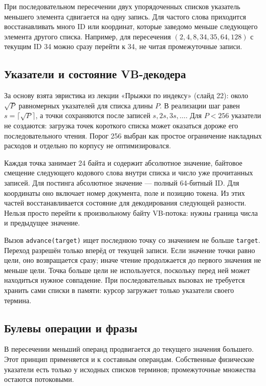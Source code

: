 \documentclass[12pt,a4paper]{article}
\begin{document}
При последовательном пересечении двух упорядоченных списков указатель
меньшего элемента сдвигается на одну запись. Для частого слова приходится
восстанавливать много ID или координат, которые заведомо меньше следующего
элемента другого списка. Например, для пересечения $(2,4,8,34,35,64,128)$
с текущим ID 34 можно сразу перейти к 34, не читая промежуточные записи.

\subsection{Указатели и состояние VB-декодера}
За основу взята эвристика из лекции «Прыжки по индексу» (слайд 22):
около $\sqrt{P}$ равномерных указателей
для списка длины $P$. В реализации шаг равен $s=\lceil\sqrt{P}\rceil$,
а точки сохраняются после записей $s,2s,3s,\ldots$.
Для $P<256$ указатели не создаются: загрузка точек короткого списка
может оказаться дороже его последовательного чтения.
Порог 256 выбран как простое ограничение накладных расходов и отдельно
по корпусу не оптимизировался.

Каждая точка занимает 24 байта и содержит абсолютное значение,
байтовое смещение следующего кодового слова внутри списка и число уже
прочитанных записей. Для постинга абсолютное значение --- полный 64-битный ID.
Для координаты оно включает номер документа, поле и позицию токена.
Из этих частей восстанавливается состояние для декодирования следующей
разности. Нельзя просто перейти к произвольному байту VB-потока:
нужны граница числа и предыдущее значение.

Вызов \texttt{advance(target)} ищет последнюю точку со значением
не больше \texttt{target}. Переход разрешён только вперёд от текущей записи.
Если значение точки равно цели, оно возвращается сразу; иначе чтение
продолжается до первого значения не меньше цели. Точка больше цели
не используется, поскольку перед ней может находиться нужное совпадение.
При последовательных вызовах не требуется хранить сами списки в памяти:
курсор загружает только указатели своего термина.

\subsection{Булевы операции и фразы}
В пересечении меньший операнд продвигается до текущего значения большего.
Этот принцип применяется и к составным операндам. Собственные физические
указатели есть только у исходных списков терминов; промежуточные множества
остаются потоковыми.
\end{document}
